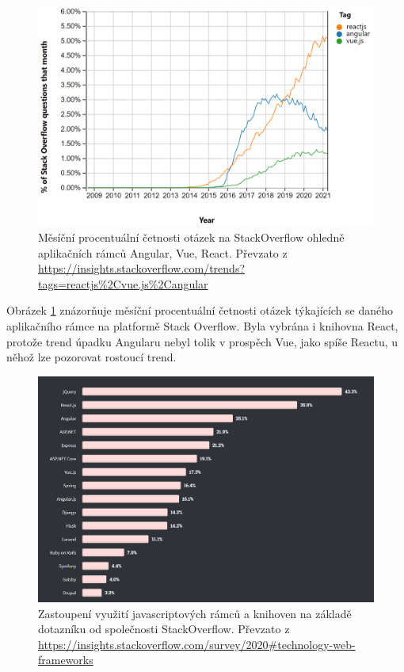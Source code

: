 \FloatBarrier
\begin{figure}[!htb]
\label{SOQuestions}
\centering
\includegraphics[width=\textwidth]{obrazky-figures/frameworkPopularityByQuestions.png}
\caption{Měsíční procentuální četnosti otázek na StackOverflow ohledně aplikačních rámců Angular, Vue, React. Převzato z \url{https://insights.stackoverflow.com/trends?tags=reactjs\%2Cvue.js\%2Cangular}}
\end{figure}
\FloatBarrier

Obrázek \ref{SOQuestions} znázorňuje měsíční procentuální četnosti otázek týkajících se daného aplikačního rámce na platformě Stack Overflow. Byla vybrána i knihovna React, protože trend úpadku Angularu nebyl tolik v prospěch Vue, jako spíše Reactu, u něhož lze pozorovat rostoucí trend.

\FloatBarrier
\begin{figure}[!htb]
\label{SOSurvey}
\centering
\includegraphics[width=\textwidth]{obrazky-figures/frameworkPopularityBySurvey.png}
\caption{Zastoupení využití javascriptových rámců a knihoven na základě dotazníku od společnosti StackOverflow. Převzato z \url{https://insights.stackoverflow.com/survey/2020#technology-web-frameworks}}
\end{figure}
\FloatBarrier

